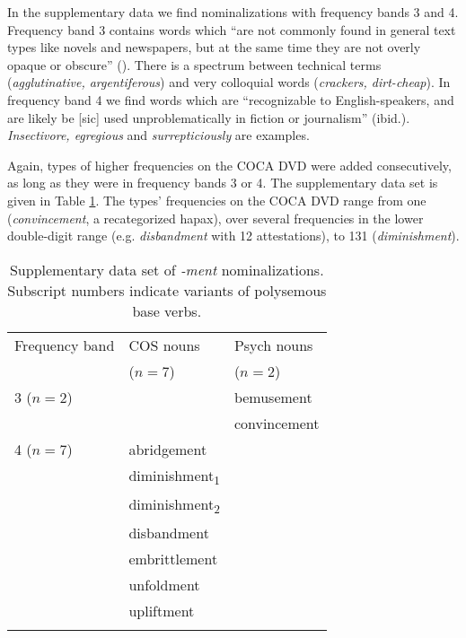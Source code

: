 In the supplementary data we find nominalizations with frequency bands 3 and 4.
Frequency band 3 contains words which ``are not commonly found in general text types like novels and newspapers, but at the same time they are not overly opaque or obscure'' (). There is a spectrum between technical terms (\textit{agglutinative, argentiferous}) and very colloquial words (\textit{crackers, dirt-cheap}).
In frequency band 4 we find words which are ``recognizable to English-speakers, and are likely be [sic] used unproblematically in fiction or journalism'' (ibid.). \textit{Insectivore, egregious} and \textit{surrepticiously} are examples. 

Again, types of higher frequencies on the COCA DVD were added consecutively, as long as they were in frequency bands 3 or 4. 
The supplementary data set is given in Table \ref{tab:suppdata set}. The types' frequencies on the COCA DVD range from one (\textit{convincement}, a recategorized hapax), over several frequencies in the lower double-digit range (e.g. \textit{disbandment} with 12 attestations), to 131 (\textit{diminishment}). 

\begin{table}
\singlespacing
	\caption[Supplementary data set of \textit{-ment} nominalizations]{\label{tab:suppdata set}Supplementary data set of \textit{-ment} nominalizations. Subscript numbers indicate variants of polysemous base verbs.} 
		\begin{tabular}{lll}
			\lsptoprule
			Frequency band & COS nouns  & Psych nouns   \\
			&  ($n=7$) &  ($n=2$) \\
			\midrule 
			3 ($n=2$)&  & {bemusement}\\
                  && {convincement} \\
                  4 ($n=7$)     &{abridgement}         &     \\
                  &{diminishment}\textsubscript{1}   &                             \\
                  &{diminishment}\textsubscript{2}   &                             \\
                  &{disbandment}         &                 \\
                  &{embrittlement} &     \\
                  &{unfoldment}          &     \\
                  &{upliftment}    &     \\			
			\lspbottomrule
		\end{tabular}       
\end{table}

